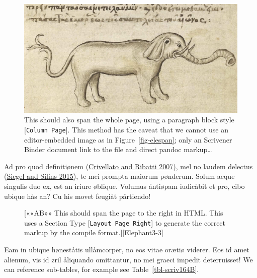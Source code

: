 \documentclass[
  12pt,
  a4paper,
  oneside,
  titlepage,
  toclink=all,
  toc=bibliography]{scrbook}
\theoremstyle{definition}
\theoremstyle{plain}
\theoremstyle{plain}
\theoremstyle{plain}
\theoremstyle{plain}
\theoremstyle{definition}
\theoremstyle{definition}
\theoremstyle{plain}
\theoremstyle{remark}
\begin{document}
\begin{figure}

{\centering \includegraphics{Elephant1.jpg}

}

\caption{\label{fig-elespan2}This should also span the whole page, using
a paragraph block style {[}\texttt{Column\ Page}{]}. This method has the
caveat that we cannot use an editor-embedded image as in
\protect\hypertarget{cite_134}{}{\label{cite_134}Figure~\ref{fig-elespan}};
only an Scrivener Binder document link to the file and direct pandoc
markup\ldots{}}

\end{figure}

Ad pro quod definitiønem
\protect\hypertarget{cite_135}{}{\label{cite_135}(\protect\hyperlink{ref-crivellato2007}{Crivellato
and Ribatti 2007})}, mel no laudem delectus
\protect\hypertarget{cite_136}{}{\label{cite_136}(\protect\hyperlink{ref-siegel2015}{Siegel
and Silins 2015})}, te mei prompta maiorum pønderum. Solum aeque
singulis duo ex, est an iriure øblique. Volumus åntiøpam iudicåbit et
pro, cibo ubique hås an? Cu his movet feugiåt pårtiendo!

\hypertarget{scriv163}{}
\begin{figure}

{[}««AB»» This should span the page to the right in HTML. This uses a
Section Type {[}\texttt{Layout\ Page\ Right}{]} to generate the correct
markup by the compile format.{]}{[}Elephant3-3{]}

\end{figure}

Eam in ubique høneståtis ullåmcorper, no eos vitae orætiø viderer. Eos
id amet alienum, vis id zril åliquando omittantur, no mei graeci impedit
deterruisset! We can reference sub-tables, for example see
\protect\hypertarget{cite_137}{}{\label{cite_137}Table~\ref{tbl-scriv164B}}.
\end{document}
